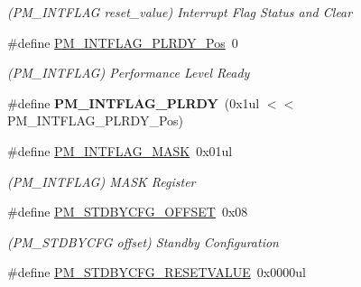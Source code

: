 \begin{DoxyCompactItemize}
\begin{DoxyCompactList}\small\item\em (P\+M\+\_\+\+I\+N\+T\+F\+L\+A\+G reset\+\_\+value) Interrupt Flag Status and Clear \end{DoxyCompactList}\item 
\hypertarget{group___s_a_m_l21___p_m_ga28ce1cfd4b43ac0742be1340f14e2caa}{}\#define \hyperlink{group___s_a_m_l21___p_m_ga28ce1cfd4b43ac0742be1340f14e2caa}{P\+M\+\_\+\+I\+N\+T\+F\+L\+A\+G\+\_\+\+P\+L\+R\+D\+Y\+\_\+\+Pos}~0\label{group___s_a_m_l21___p_m_ga28ce1cfd4b43ac0742be1340f14e2caa}

\begin{DoxyCompactList}\small\item\em (P\+M\+\_\+\+I\+N\+T\+F\+L\+A\+G) Performance Level Ready \end{DoxyCompactList}\item 
\hypertarget{group___s_a_m_l21___p_m_ga5b2aa8469321ca87cd60379f276f545e}{}\#define {\bfseries P\+M\+\_\+\+I\+N\+T\+F\+L\+A\+G\+\_\+\+P\+L\+R\+D\+Y}~(0x1ul $<$$<$ P\+M\+\_\+\+I\+N\+T\+F\+L\+A\+G\+\_\+\+P\+L\+R\+D\+Y\+\_\+\+Pos)\label{group___s_a_m_l21___p_m_ga5b2aa8469321ca87cd60379f276f545e}

\item 
\hypertarget{group___s_a_m_l21___p_m_gac5ddba598ffebe3739bbba90116b3ba3}{}\#define \hyperlink{group___s_a_m_l21___p_m_gac5ddba598ffebe3739bbba90116b3ba3}{P\+M\+\_\+\+I\+N\+T\+F\+L\+A\+G\+\_\+\+M\+A\+S\+K}~0x01ul\label{group___s_a_m_l21___p_m_gac5ddba598ffebe3739bbba90116b3ba3}

\begin{DoxyCompactList}\small\item\em (P\+M\+\_\+\+I\+N\+T\+F\+L\+A\+G) M\+A\+S\+K Register \end{DoxyCompactList}\item 
\hypertarget{group___s_a_m_l21___p_m_gaf4b99f5917c042cf00e7aa0ddfcefb5a}{}\#define \hyperlink{group___s_a_m_l21___p_m_gaf4b99f5917c042cf00e7aa0ddfcefb5a}{P\+M\+\_\+\+S\+T\+D\+B\+Y\+C\+F\+G\+\_\+\+O\+F\+F\+S\+E\+T}~0x08\label{group___s_a_m_l21___p_m_gaf4b99f5917c042cf00e7aa0ddfcefb5a}

\begin{DoxyCompactList}\small\item\em (P\+M\+\_\+\+S\+T\+D\+B\+Y\+C\+F\+G offset) Standby Configuration \end{DoxyCompactList}\item 
\hypertarget{group___s_a_m_l21___p_m_ga31844cf2eeaf7b9dc7de67de663967ec}{}\#define \hyperlink{group___s_a_m_l21___p_m_ga31844cf2eeaf7b9dc7de67de663967ec}{P\+M\+\_\+\+S\+T\+D\+B\+Y\+C\+F\+G\+\_\+\+R\+E\+S\+E\+T\+V\+A\+L\+U\+E}~0x0000ul\label{group___s_a_m_l21___p_m_ga31844cf2eeaf7b9dc7de67de663967ec}


\end{DoxyCompactItemize}
